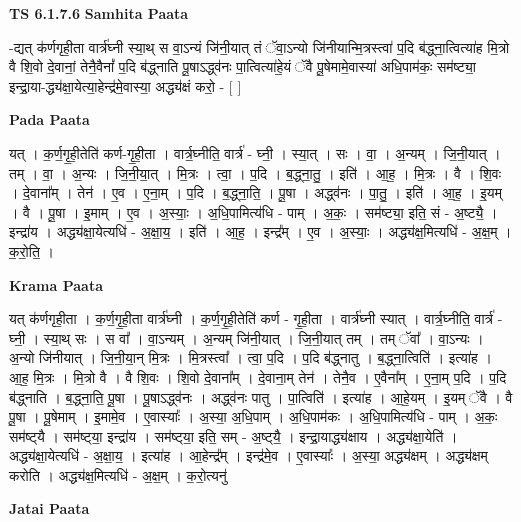 \documentclass[17pt]{extarticle}
\begin{document}
\textbf{TS 6.1.7.6 } \newline
\textbf{Samhita Paata} \newline

-द्यत् क॑र्णगृही॒ता वार्त्र॑घ्नी स्या॒थ् स वा॒ऽन्यं जि॑नी॒यात् तं ॅवा॒ऽन्यो जि॑नीयान्मि॒त्रस्त्वा॑ प॒दि ब॑द्ध्ना॒त्वित्या॑ह मि॒त्रो वै शि॒वो दे॒वानां॒ तेनै॒वैनां᳚ प॒दि ब॑द्ध्नाति पू॒षाऽद्ध्व॑नः पा॒त्वित्या॑हे॒यं ॅवै पू॒षेमामे॒वास्या॑ अधि॒पाम॑कः॒ सम॑ष्ट्या॒ इन्द्रा॒या-द्ध्य॑क्षा॒येत्या॒हेन्द्र॑मे॒वास्या॒ अद्ध्य॑क्षं करो॒ - [  ] \newline

\textbf{Pada Paata} \newline

यत् । क॒र्ण॒गृ॒ही॒तेति॑ कर्ण-गृ॒ही॒ता । वार्त्र॒घ्नीति॒ वार्त्र॑ - घ्नी॒ । स्या॒त् । सः । वा॒ । अ॒न्यम् । जि॒नी॒यात् । तम् । वा॒ । अ॒न्यः । जि॒नी॒या॒त् । मि॒त्रः । त्वा॒ । प॒दि । ब॒द्ध्ना॒तु॒ । इति॑ । आ॒ह॒ । मि॒त्रः । वै । शि॒वः । दे॒वाना᳚म् । तेन॑ । ए॒व । ए॒ना॒म् । प॒दि । ब॒द्ध्ना॒ति॒ । पू॒षा । अद्ध्व॑नः । पा॒तु॒ । इति॑ । आ॒ह॒ । इ॒यम् । वै । पू॒षा । इ॒माम् । ए॒व । अ॒स्याः॒ । अ॒धि॒पामित्य॑धि - पाम् । अ॒कः॒ । सम॑ष्ट्या॒ इति॒ सं - अ॒ष्ट्यै॒ । इन्द्रा॑य । अद्ध्य॑क्षा॒येत्यधि॑ - अ॒क्षा॒य॒ । इति॑ । आ॒ह॒ । इन्द्र᳚म् । ए॒व । अ॒स्याः॒ । अद्ध्य॑क्ष॒मित्यधि॑ - अ॒क्ष॒म् । क॒रो॒ति॒ ।  \newline


\textbf{Krama Paata} \newline

यत् क॑र्णगृही॒ता । क॒र्ण॒गृ॒ही॒ता वार्त्र॑घ्नी । क॒र्ण॒गृ॒ही॒तेति॑ कर्ण - गृ॒ही॒ता । वार्त्र॑घ्नी स्यात् । वार्त्र॒घ्नीति॒ वार्त्र॑ - घ्नी॒ । स्या॒थ् सः । स वा᳚ । वा॒ऽन्यम् । अ॒न्यम् जि॑नी॒यात् । जि॒नी॒यात् तम् । तम् ॅवा᳚ । वा॒ऽन्यः । अ॒न्यो जि॑नीयात् । जि॒नी॒या॒न् मि॒त्रः । मि॒त्रस्त्वा᳚ । त्वा॒ प॒दि । प॒दि ब॑द्ध्नातु । ब॒द्ध्ना॒त्विति॑ । इत्या॑ह । आ॒ह॒ मि॒त्रः । मि॒त्रो वै । वै शि॒वः । शि॒वो दे॒वाना᳚म् । दे॒वाना॒म् तेन॑ । तेनै॒व । ए॒वैना᳚म् । ए॒ना॒म् प॒दि । प॒दि ब॑द्ध्नाति । ब॒द्ध्ना॒ति॒ पू॒षा । पू॒षाऽद्ध्व॑नः । अद्ध्व॑नः पातु । पा॒त्विति॑ । इत्या॑ह । आ॒हे॒यम् । इ॒यम् ॅवै । वै पू॒षा । पू॒षेमाम् । इ॒मामे॒व । ए॒वास्याः᳚ । अ॒स्या॒ अ॒धि॒पाम् । अ॒धि॒पाम॑कः । अ॒धि॒पामित्य॑धि - पाम् । अ॒कः॒ सम॑ष्ट्‍यै । सम॑ष्ट्‍या॒ इन्द्रा॑य । सम॑ष्ट्‍या॒ इति॒ सम् - अ॒ष्ट्‍यै॒ । इन्द्रा॒याद्ध्य॑क्षाय । अद्ध्य॑क्षा॒येति॑ । अद्ध्य॑क्षा॒येत्यधि॑ - अ॒क्षा॒य॒ । इत्या॑ह । आ॒हेन्द्र᳚म् । इन्द्र॑मे॒व । ए॒वास्याः᳚ । अ॒स्या॒ अद्ध्य॑क्षम् । अद्ध्य॑क्षम् करोति । अद्ध्य॑क्ष॒मित्यधि॑ - अ॒क्ष॒म् । क॒रो॒त्यनु॑ \newline

\textbf{Jatai Paata} \newline
\end{document}
